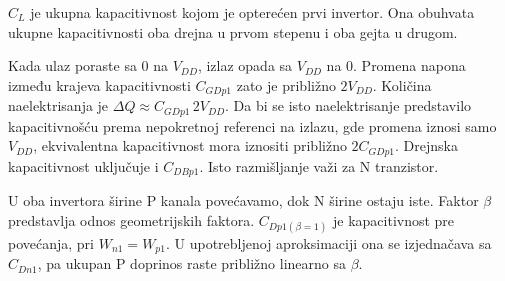 $C_L$ je ukupna kapacitivnost kojom je opterećen prvi invertor. Ona obuhvata ukupne kapacitivnosti oba drejna u prvom stepenu i oba gejta u drugom.

Kada ulaz poraste sa $0$ na $V_{DD}$, izlaz opada sa $V_{DD}$ na $0$. Promena napona između krajeva kapacitivnosti $C_{GDp1}$ zato je približno $2V_{DD}$. Količina naelektrisanja je $\Delta Q\approx C_{GDp1}\,2V_{DD}$. Da bi se isto naelektrisanje predstavilo kapacitivnošću prema nepokretnoj referenci na izlazu, gde promena iznosi samo $V_{DD}$, ekvivalentna kapacitivnost mora iznositi približno $2C_{GDp1}$. Drejnska kapacitivnost uključuje i $C_{DBp1}$. Isto razmišljanje važi za N tranzistor.

U oba invertora širine P kanala povećavamo, dok N širine ostaju iste. Faktor $\beta$ predstavlja odnos geometrijskih faktora. $C_{Dp1(\beta=1)}$ je kapacitivnost pre povećanja, pri $W_{n1}=W_{p1}$. U upotrebljenoj aproksimaciji ona se izjednačava sa $C_{Dn1}$, pa ukupan P doprinos raste približno linearno sa $\beta$.
